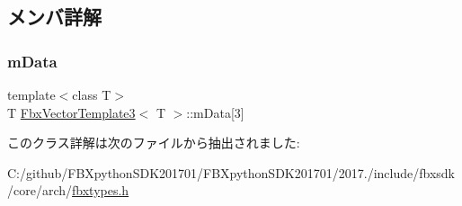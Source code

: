 \subsection{メンバ詳解}
\mbox{\label{class_fbx_vector_template3_a63f8316f392b536de41dfaa2031a2d54}} 
\subsubsection{\texorpdfstring{m\+Data}{mData}}
{\footnotesize\ttfamily template$<$class T$>$ \\
T \hyperlink{class_fbx_vector_template3}{Fbx\+Vector\+Template3}$<$ T $>$\+::m\+Data\mbox{[}3\mbox{]}}



このクラス詳解は次のファイルから抽出されました\+:\begin{DoxyCompactItemize}
\item 
C\+:/github/\+F\+B\+Xpython\+S\+D\+K201701/\+F\+B\+Xpython\+S\+D\+K201701/2017./include/fbxsdk/core/arch/\hyperlink{fbxtypes_8h}{fbxtypes.\+h}\end{DoxyCompactItemize}
